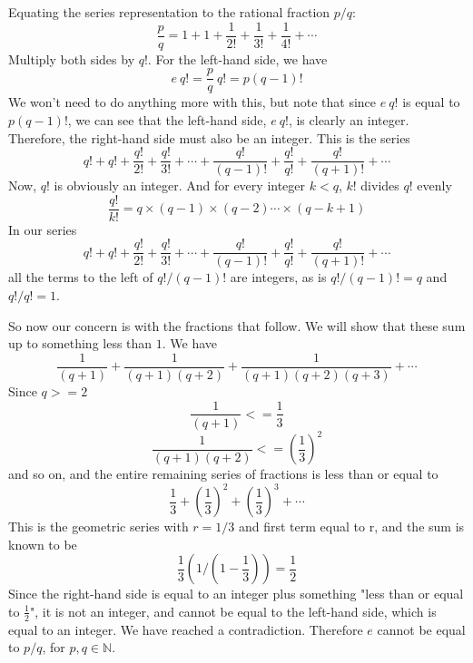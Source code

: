 \documentclass[11pt, oneside]{article}
\begin{document}
Equating the series representation to the rational fraction $p/q$:
\[ \frac{p}{q} = 1 + 1 + \frac{1}{2!}  + \frac{1}{3!} + \frac{1}{4!} + \cdots \]
Multiply both sides by $q!$.  For the left-hand side, we have 
\[ e \ q! = \frac{p}{q} \ q! = p (q-1)! \]
We won't need to do anything more with this, but note that since $e\ q!$ is equal to $p (q-1)!$, we can see that the left-hand side, $e\ q!$, is clearly an integer.
Therefore, the right-hand side must also be an integer.  This is the series
\[ q! + q! + \frac{q!}{2!}  + \frac{q!}{3!}  + \cdots + \frac{q!}{(q-1)!} + \frac{q!}{q!} + \frac{q!}{(q+1)!} + \cdots \]
Now, 
$q!$ is obviously an integer. And for every integer $k < q$, $k!$ divides $q!$ evenly 
\[ \frac{q!}{k!} = q \times (q-1) \times (q-2) \cdots \times (q-k+1) \]
In our series
\[ q! + q! + \frac{q!}{2!}  + \frac{q!}{3!}  + \cdots + \frac{q!}{(q-1)!} + \frac{q!}{q!} + \frac{q!}{(q+1)!} + \cdots \]
all the terms to the left of $q!/(q-1)!$ are integers, as is $q!/(q-1)! = q$ and $q!/q! = 1$.  
\vspace{2 mm}

So now our concern is with the fractions that follow.  We will show that these sum up to something less than $1$.  We have
\[ \frac{1}{(q+1)} + \frac{1}{(q+1)(q+2)} + \frac{1}{(q+1)(q+2)(q+3)} + \cdots \]
Since $q >= 2$
\[ \frac{1}{(q+1)} <= \frac{1}{3} \]
\[ \frac{1}{(q+1)(q+2)} <= (\frac{1}{3})^2 \]
and so on, and the entire remaining series of fractions is less than or equal to
\[ \frac{1}{3} + (\frac{1}{3})^2 + (\frac{1}{3})^3 + \cdots \]
This is the geometric series with $r = 1/3$ and first term equal to r, and the sum is known to be
\[ \frac{1}{3} ( 1 / (1-\frac{1}{3}) ) = \frac{1}{2} \]
Since the right-hand side is equal to an integer plus something "less than or equal to $\frac{1}{2}$", it is not an integer, and cannot be equal to the left-hand side, which is equal to an integer.  We have reached a contradiction.  Therefore $e$ cannot be equal to $p/q$, for $p,q \in \mathbb{N}$.
\end{document}
